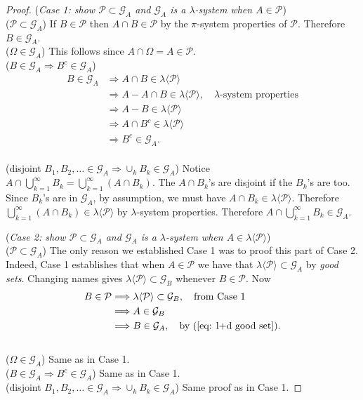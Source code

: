 \begin{proof}
({\sl Case 1: show $\mathcal P\subset \mathcal G_A$ and $\mathcal G_A$ is a $\lambda$-system when $A\in \mathcal P$})
\\
\textbullet($\mathcal P\subset \mathcal G_A$) If $B\in \mathcal P$ then $A\cap B\in \mathcal P$ by the $\pi$-system properties of $\mathcal P$. Therefore $B\in \mathcal G_A$.
\\
\textbullet($\Omega\in \mathcal G_A$) This follows since $A\cap \Omega = A \in \mathcal P$.
\\
\textbullet($B\in \mathcal G_A\Longrightarrow B^c\in \mathcal G_A$)
\begin{align*}
B\in \mathcal G_A
&\Longrightarrow A\cap B\in \lambda\langle \mathcal P\rangle \\
&\Longrightarrow A - A\cap B\in \lambda\langle \mathcal P\rangle,\quad\text{$\lambda$-system properties} \\
&\Longrightarrow A -  B\in \lambda\langle \mathcal P\rangle \\
&\Longrightarrow A \cap  B^c\in \lambda\langle \mathcal P\rangle \\
&\Longrightarrow B^c\in \mathcal G_A.
\end{align*}
\\
\textbullet(disjoint $B_1, B_2, \ldots\in \mathcal G_A\Longrightarrow \cup_k B_k\in \mathcal G_A$)
Notice  $A \cap \bigcup_{k=1}^\infty B_k =  \bigcup_{k=1}^\infty (A \cap B_k)$. The $A\cap B_k$'s are disjoint if the $B_k$'s are too. Since $B_k$'s  are in $\mathcal G_A$, by assumption, we must have $A\cap B_k\in \lambda\langle \mathcal P\rangle$.
Therefore  $ \bigcup_{k=1}^\infty (A \cap B_k)\in \lambda\langle \mathcal P\rangle$ by $\lambda$-system properties.
Therefore $A \cap \bigcup_{k=1}^\infty B_k \in \mathcal G_A$.


({\sl Case 2: show $\mathcal P\subset \mathcal G_A$ and $\mathcal G_A$ is a $\lambda$-system when $A\in \lambda\langle\mathcal P\rangle$})
\\
\textbullet($\mathcal P\subset \mathcal G_A$) The only reason we established Case 1 was to proof this part of Case 2. Indeed,  Case 1 establishes that when $A\in \mathcal P$ we have that $\lambda\langle \mathcal P\rangle \subset \mathcal G_A$ by {\it good sets}. Changing names gives $\lambda\langle \mathcal P\rangle \subset \mathcal G_B$ whenever $B\in \mathcal P$. Now
\begin{align*}
B\in \mathcal P
&\Longrightarrow  \lambda\langle \mathcal P\rangle \subset \mathcal G_B,\quad\text{from Case 1}\\
&\Longrightarrow  A \in \mathcal G_B\\
&\Longrightarrow  B \in \mathcal G_A,\quad\text{by (\ref{eq: l+d good set}).}
\end{align*}
\\
\textbullet($\Omega\in \mathcal G_A$) Same as in Case 1.
\\
\textbullet($B\in \mathcal G_A\Longrightarrow B^c\in \mathcal G_A$) Same as in Case 1.
\\
\textbullet(disjoint $B_1, B_2, \ldots\in \mathcal G_A\Longrightarrow \cup_k B_k\in \mathcal G_A$) Same proof as in Case 1.


\end{proof}



